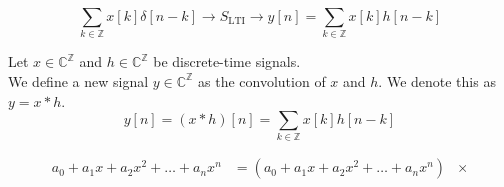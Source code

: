 \begin{definition}
    $$ \sum_{k\in \mathbb{Z}} x[k] \delta[n-k] \rightarrow \boxed{S_\text{LTI}} \rightarrow y[n] = \sum_{k\in \mathbb{Z}} x[k] h[n-k]$$
\end{definition}


\begin{definition}
    [Convolution]
    Let $x\in \mathbb{C}^{\mathbb{Z}}$ and $h\in \mathbb{C}^{\mathbb{Z}}$ be discrete-time signals.\\
    We define a new signal $y\in \mathbb{C}^{\mathbb{Z}}$ as the convolution of $x$ and $h$. We denote this as $y = x * h$.
    $$ y[n] = (x*h)[n] = \sum_{k\in \mathbb{Z}} x[k] h[n-k]$$
\end{definition}

\begin{example}
    \begin{align*}
        a_0 + a_1 x + a_2 x^2 + \ldots + a_n x^n &= (a_0 + a_1 x + a_2 x^2 + \ldots + a_n x^n) & \times \\
    \end{align*}
\end{example}